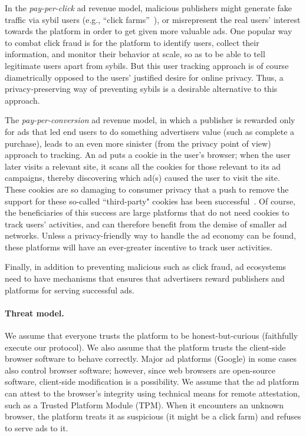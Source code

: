 %
%
%
In the \emph{pay-per-click} ad revenue model, malicious publishers might generate fake traffic via sybil users (e.g., ``click
farms''~\cite{understanding-ad-fraud}), or misrepresent the real users' interest
towards the platform in order to get given more valuable ads.
%
One popular way to combat click fraud is for the platform to identify users,
collect their information, and monitor their behavior at scale, so as to be able to tell legitimate users apart from sybils.
%
But this user tracking approach is of course diametrically opposed to the users' justified desire for online
privacy.
%
Thus, a privacy-preserving way of preventing sybils is a desirable alternative to this approach.
%

%
The \emph{pay-per-conversion} ad revenue model, in which a publisher is rewarded only for ads that led end users to do something advertisers value (such as complete a purchase), leads to an even more sinister (from the privacy point of view) approach to tracking.
%
An ad puts a cookie in the user's browser; when the user later visits a relevant site, it scans all the cookies for those relevant to its ad campaigns, thereby discovering which ad(s) caused the user to visit the site.
%
These cookies are so damaging to consumer privacy that a push to remove the support for these so-called ``third-party" cookies has been successful~\cite{consumerreports-3rd-party-cookies}.
%
Of course, the beneficiaries of this success are large platforms that do not need cookies to track users' activities, and can therefore benefit from the demise of smaller ad networks.
%
Unless a privacy-friendly way to handle the ad economy can be found, these platforms will have an ever-greater incentive to track user activities.
%

%
Finally, in addition to preventing malicious such as click fraud, ad ecosystems need to have mechanisms that ensures that advertisers reward publishers and platforms for serving successful ads.  
%

\paragraph{Threat model.}
%
We assume that everyone trusts the platform to be honest-but-curious (\ie faithfully execute our protocol). 
%
We also assume that the platform trusts the client-side browser software to behave correctly.
%
Major ad platforms (\eg Google) in some cases also control browser software; however, since web browsers are open-source software, client-side modification is a possibility.
%
We assume that the ad platform can attest to the browser's integrity using technical means for remote attestation, such as a Trusted Platform Module (TPM).
%
When it encounters an unknown browser, the platform treats it as suspicious (\ie it might be a click farm) and refuses to serve ads to it.
%

